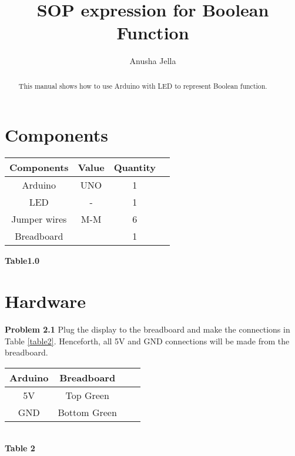 \documentclass{article}
\title{SOP expression for Boolean Function}
\author{Anusha Jella}
\begin{document}
\maketitle
\begin{multicols}{2}
\tableofcontents

\begin{abstract}
 This manual shows how to use Arduino with LED to represent Boolean function.
\end{abstract}
\section {Components}

    \centering
    \begin{tabular}{ |c |c |c |c |}
\hline
\textbf{Components} & \textbf{Value} & \textbf{Quantity} \\
\hline
 Arduino & UNO & 1 \\  
 LED & - & 1 \\
 Jumper wires&M-M &6\\
 Breadboard& &1\\
 \hline
 \end{tabular}
 \vspace{3mm}
 \centering
 \textbf{Table1.0}
    \label{table1}

\section{Hardware}
\begin{flushleft}
\textbf{Problem 2.1} Plug the display to the breadboard and make the connections in Table \ref{table2}. Henceforth, all 5V and GND connections will be made from the breadboard. 
\end{flushleft}
\hspace{10mm}
\vspace{10mm}
 \centering
    \begin{tabular}{ |c |c |c |c |}
\hline
\textbf{Arduino} & \textbf{Breadboard} \\
\hline
 5V & Top Green \\  
 GND & Bottom Green\\
  \hline
 \end{tabular}
 \\
\centering
 \textbf{Table 2}
    \label{table2}
    

\end{multicols}
\end{document}
